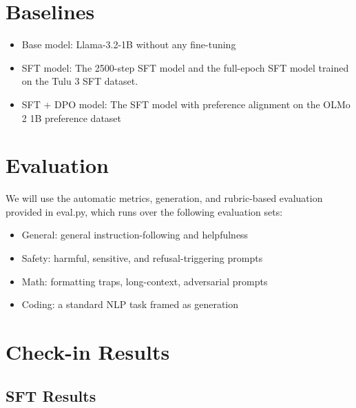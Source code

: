 \documentclass[11pt]{article}
\begin{document}
\section{Baselines}
\begin{itemize}
  \item Base model: Llama-3.2-1B without any fine-tuning
  \item SFT model: The 2500-step SFT model and the full-epoch SFT model trained on the Tulu 3 SFT dataset.
  \item SFT + DPO model: The SFT model with preference alignment on the OLMo 2 1B preference dataset
\end{itemize}

\section{Evaluation}
We will use the automatic metrics, generation, and rubric-based evaluation provided in eval.py, which runs over the following evaluation sets: 
\begin{itemize}
  \item General: general instruction-following and helpfulness
  \item Safety: harmful, sensitive, and refusal-triggering prompts
  \item Math: formatting traps, long-context, adversarial prompts
  \item Coding: a standard NLP task framed as generation
\end{itemize}

\section{Check-in Results}
\subsection{SFT Results}
\end{document}
